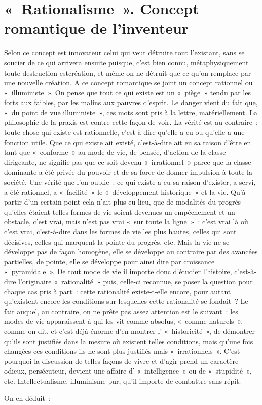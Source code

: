 \documentclass[french,twoside]{book} %
\begin{document}
\section[{« Rationalisme ». Concept romantique de l’inventeur}]{« Rationalisme ». Concept romantique de l’inventeur}
\noindent Selon ce concept est innovateur celui qui veut détruire tout l’existant, sans se soucier de ce qui arrivera ensuite puisque, c’est bien connu, métaphysiquement toute destruction estcréation, et même on ne détruit que ce qu’on remplace par une nouvelle création. A ce concept romantique se joint un concept rationnel ou « illuministe ». On pense que tout ce qui existe est un « piège » tendu par les forts aux faibles, par les malins aux pauvres d’esprit. Le danger vient du fait que, « du point de vue illuministe », ces mots sont pris à la lettre, matériellement. La philosophie de la praxis est contre cette façon de voir. La vérité est au contraire : toute chose qui existe est rationnelle, c’est-à-dire qu’elle a eu ou qu’elle a une fonction utile. Que ce qui existe ait existé, c’est-à-dire ait eu sa raison d’être en tant que « conforme » au mode de vie, de pensée, d’action de la classe dirigeante, ne signifie pas que ce soit devenu « irrationnel » parce que la classe dominante a été privée du pouvoir et de sa force de donner impulsion à toute la société. Une vérité que l’on oublie : ce qui existe a eu sa raison d’exister, a servi, a été rationnel, a « facilité » le « développement historique » et la vie. Qu'à partir d’un certain point cela n’ait plus eu lieu, que de modalités du progrès qu’elles étaient telles formes de vie soient devenues un empêchement et un obstacle, c’est vrai, mais n’est pas vrai « sur toute la ligne » : c’est vrai là où c’est vrai, c’est-à-dire dans les formes de vie les plus hautes, celles qui sont décisives, celles qui marquent la pointe du progrès, etc. Mais la vie ne se développe pas de façon homogène, elle se développe au contraire par des avancées partielles, de pointe, elle se développe pour ainsi dire par croissance « pyramidale ». De tout mode de vie il importe donc d’étudier l’histoire, c’est-à-dire l’originaire « rationalité » puis, celle-ci reconnue, se poser la question pour chaque cas pris à part : cette rationalité existe-t-elle encore, pour autant qu’existent encore les conditions sur lesquelles cette rationalité se fondait ? Le fait auquel, au contraire, on ne prête pas assez attention est le suivant : les modes de vie apparaissent à qui les vit comme absolus, « comme naturels », comme on dit, et c’est déjà énorme d’en montrer l’ « historicité », de démontrer qu’ils sont justifiés dans la mesure où existent telles conditions, mais qu’une fois changées ces conditions ils ne sont plus justifiés mais « irrationnels ». C'est pourquoi la discussion de telles façons de vivre et d’agir prend un caractère odieux, persécuteur, devient une affaire d’ « intelligence » ou de « stupidité », etc. Intellectualisme, illuminisme pur, qu’il importe de combattre sans répit.\par
On en déduit :\par
\end{document}
